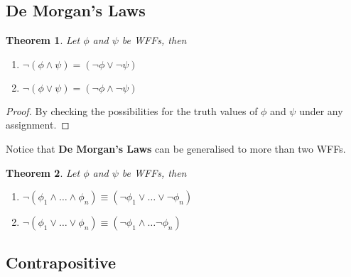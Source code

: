 \documentclass[11pt]{article}
\theoremstyle{definition}
\newtheorem{theorem}{Theorem}[subsection]
\begin{document}
\subsection{De Morgan's Laws}
\begin{shaded}
\begin{theorem}
    \textit{Let $\phi$ and $\psi$ be WFFs, then}
    \begin{enumerate}
        \item $\neg (\phi \wedge \psi)=(\neg \phi \vee \neg \psi)$
        \item $\neg (\phi \vee \psi)=(\neg \phi \wedge \neg \psi)$
    \end{enumerate}
\end{theorem}
\end{shaded}

\begin{proof}
    By checking the possibilities for the truth values of $\phi$ and $\psi$ under any assignment.
\end{proof}

Notice that \textbf{De Morgan's Laws} can be generalised to more than two WFFs.
\begin{shaded}
\begin{theorem}
    \textit{Let $\phi$ and $\psi$ be WFFs, then}
    \begin{enumerate}
        \item $\neg (\phi_{1} \wedge \dots \wedge \phi_{n}) \equiv (\neg \phi_{1} \vee \dots \vee \neg \phi_{n})$
        \item $\neg (\phi_{1} \vee \dots \vee \phi_{n}) \equiv (\neg \phi_{1} \wedge \dots \neg \phi_{n})$
    \end{enumerate}
\end{theorem}
\end{shaded}

\subsection{Contrapositive}
\end{document}
